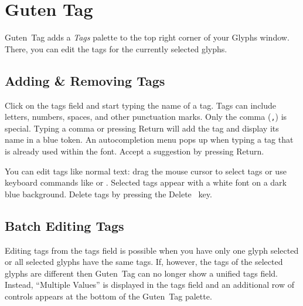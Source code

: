 \chapter{Guten Tag}%
\label{cha:guten_tag}

\noindent Guten~Tag adds a \emph{Tags} palette to the top right corner of your Glyphs window.
There, you can edit the tags for the currently selected glyphs.

\bigbreak\noindent%
\bigbreak

\section{Adding \& Removing Tags}%
\label{sec:adding_and_removing_tags}

\hfill
{}\hfill
{}

\medbreak\noindent Click on the tags field and start typing the name of a tag.
Tags can include letters, numbers, spaces, and other punctuation marks.
Only the comma (\texttt{,}) is special.
Typing a comma or pressing Return will add the tag and display its name in a blue token.
An autocompletion menu pops up when typing a tag that is already used within the font.
Accept a suggestion by pressing Return.

\noindent%
\hfill
{}\hfill
{}\hfill

\medbreak\noindent You can edit tags like normal text: drag the mouse cursor to select tags or use keyboard commands like  or .
Selected tags appear with a white font on a dark blue background.
Delete tags by pressing the Delete~ key.

\section{Batch Editing Tags}%
\label{sec:batch_editing_tags}

Editing tags from the tags field is possible when you have only one glyph selected or all selected glyphs have the same tags.
If, however, the tags of the selected glyphs are different then Guten~Tag can no longer show a unified tags field.
Instead, \enquote{Multiple Values} is displayed in the tags field and an additional row of controls appears at the bottom of the Guten~Tag palette.

